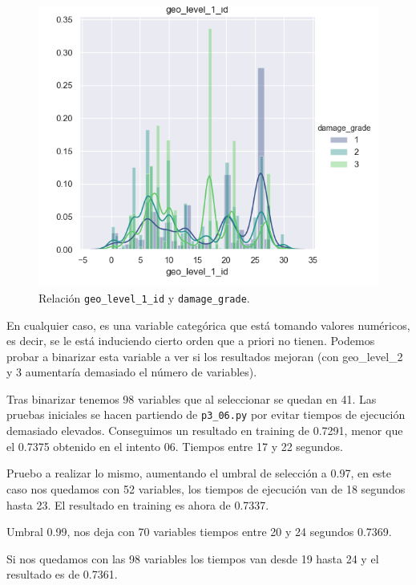 \documentclass[a4paper, 20pt]{article}
\begin{document}
\begin{figure}[H]
    \centering
    \includegraphics[height=0.9\textwidth, width=1.0\textwidth]{geo_level_1_2}
    \caption{Relación \texttt{geo\_level\_1\_id} y \texttt{damage\_grade}.}
    \label{fig:geo12}
\end{figure}

En cualquier caso, es una variable categórica que está tomando valores numéricos, es decir, se le está induciendo cierto orden que a priori no tienen. Podemos probar a binarizar esta variable a ver si los resultados mejoran (con geo\_level\_2 y 3 aumentaría demasiado el número de variables).

Tras binarizar tenemos 98 variables que al seleccionar se quedan en 41. Las pruebas iniciales se hacen partiendo de \texttt{p3\_06.py} por evitar tiempos de ejecución demasiado elevados. Conseguimos un resultado en training de 0.7291, menor que el 0.7375 obtenido en el intento 06. Tiempos entre 17 y 22 segundos.

Pruebo a realizar lo mismo, aumentando el umbral de selección a 0.97, en este caso nos quedamos con 52 variables, los tiempos de ejecución van de 18 segundos hasta 23. El resultado en training es ahora de 0.7337.

Umbral 0.99, nos deja con 70 variables tiempos entre 20 y 24 segundos
0.7369.

Si nos quedamos con las 98 variables los tiempos van desde 19 hasta 24 y el resultado es de 0.7361.
\end{document}
